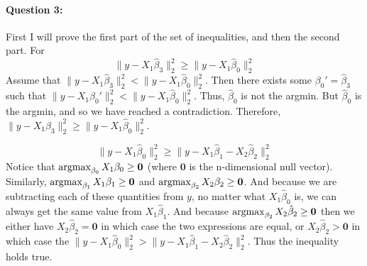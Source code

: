 \documentclass[letterpaper,11pt]{article}
\begin{document}
\paragraph{Question 3:}
First I will prove the first part of the set of inequalities, and then the second part.
For
\begin{equation}
  \|y-X_1\hat{\beta}_3\|_2^2 \geq \|y-X_1\hat{\beta}_0\|_2^2
\end{equation}
Assume that $\|y-X_1\hat{\beta}_3\|_2^2 < \|y-X_1\hat{\beta}_0\|_2^2$. Then there exists some $\beta_0' = \hat{\beta}_3$ 
such that $\|y-X_1\beta_0'\|_2^2 < \|y-X_1\hat{\beta}_0\|_2^2$. Thus, $\hat{\beta}_0$ is not the argmin. But $\hat{\beta}_0$
is the argmin, and so we have reached a contradiction. Therefore, $\|y-X_1\hat{\beta}_3\|_2^2 \geq \|y-X_1\hat{\beta}_0\|_2^2$.


\begin{equation}
  \|y-X_1\hat{\beta}_0\|_2^2 \geq \|y-X_1\hat{\beta}_1-X_2\hat{\beta}_2\|_2^2
\end{equation}
Notice that $\mathop{\rm argmax}_{\beta_0} X_1\beta_0 \geq \textbf{0}$ (where $\textbf{0}$ is the n-dimensional null vector). Similarly,
$\mathop{\rm argmax}_{\beta_1} X_1\beta_1 \geq \textbf{0}$ and $\mathop{\rm argmax}_{\beta_2} X_2\beta_2 \geq \textbf{0}$.
And because we are subtracting each of these quantities from $y$, no matter what $X_1\hat{\beta}_0$ is, we can always get the same value
from $X_1\hat{\beta}_1$. And because $\mathop{\rm argmax}_{\beta_2} X_2\hat{\beta}_2 \geq \textbf{0}$ then we either have
$X_2\hat{\beta}_2 = \textbf{0}$ in which case the two expressions are equal, or 
$X_2\hat{\beta}_2 > \textbf{0}$ in which case the $\|y-X_1\hat{\beta}_0\|_2^2 > \|y-X_1\hat{\beta}_1-X_2\hat{\beta}_2\|_2^2$. Thus the inequality
holds true.
\end{document}
